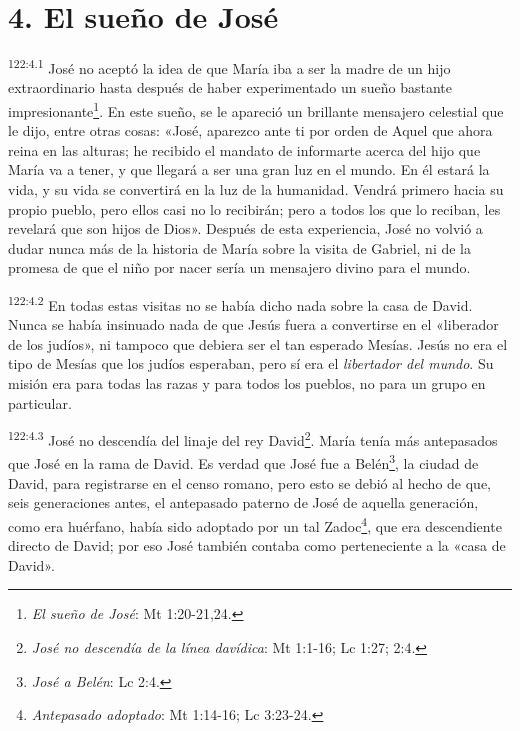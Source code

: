 \section*{4. El sueño de José}
\par
\textsuperscript{122:4.1} José no aceptó la idea de que María iba a ser la madre de un hijo extraordinario hasta después de haber experimentado un sueño bastante impresionante\footnote{\textit{El sueño de José}: Mt 1:20-21,24.}. En este sueño, se le apareció un brillante mensajero celestial que le dijo, entre otras cosas: «José, aparezco ante ti por orden de Aquel que ahora reina en las alturas; he recibido el mandato de informarte acerca del hijo que María va a tener, y que llegará a ser una gran luz en el mundo. En él estará la vida, y su vida se convertirá en la luz de la humanidad. Vendrá primero hacia su propio pueblo, pero ellos casi no lo recibirán; pero a todos los que lo reciban, les revelará que son hijos de Dios». Después de esta experiencia, José no volvió a dudar nunca más de la historia de María sobre la visita de Gabriel, ni de la promesa de que el niño por nacer sería un mensajero divino para el mundo.

\par
\textsuperscript{122:4.2} En todas estas visitas no se había dicho nada sobre la casa de David. Nunca se había insinuado nada de que Jesús fuera a convertirse en el «liberador de los judíos», ni tampoco que debiera ser el tan esperado Mesías. Jesús no era el tipo de Mesías que los judíos esperaban, pero sí era el \textit{libertador del mundo}. Su misión era para todas las razas y para todos los pueblos, no para un grupo en particular.

\par
\textsuperscript{122:4.3} José no descendía del linaje del rey David\footnote{\textit{José no descendía de la línea davídica}: Mt 1:1-16; Lc 1:27; 2:4.}. María tenía más antepasados que José en la rama de David. Es verdad que José fue a Belén\footnote{\textit{José a Belén}: Lc 2:4.}, la ciudad de David, para registrarse en el censo romano, pero esto se debió al hecho de que, seis generaciones antes, el antepasado paterno de José de aquella generación, como era huérfano, había sido adoptado por un tal Zadoc\footnote{\textit{Antepasado adoptado}: Mt 1:14-16; Lc 3:23-24.}, que era descendiente directo de David; por eso José también contaba como perteneciente a la «casa de David».

